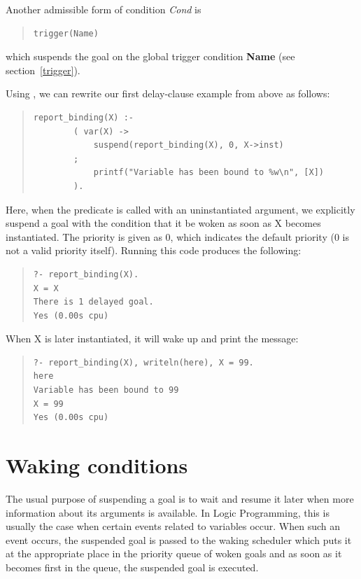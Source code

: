 Another admissible form of condition {\it Cond} is
\begin{quote}\begin{verbatim}
trigger(Name)
\end{verbatim}\end{quote}
which suspends the goal on the global trigger condition {\bf Name}
(see section~\ref{trigger}).


Using
,
we can rewrite our first delay-clause example from above as follows:
\begin{quote}\begin{verbatim}
report_binding(X) :-
        ( var(X) ->
            suspend(report_binding(X), 0, X->inst)
        ;
            printf("Variable has been bound to %w\n", [X])
        ).
\end{verbatim}\end{quote}
Here, when the predicate is called with an uninstantiated argument,
we explicitly suspend a goal with the condition that it be woken as
soon as X becomes instantiated. The priority is given as 0, which indicates
the default priority (0 is not a valid priority itself).
Running this code produces the following:
\begin{quote}\begin{verbatim}
?- report_binding(X).
X = X
There is 1 delayed goal.
Yes (0.00s cpu)
\end{verbatim}\end{quote}
When X is later instantiated, it will wake up and print the message:
\begin{quote}\begin{verbatim}
?- report_binding(X), writeln(here), X = 99.
here
Variable has been bound to 99
X = 99
Yes (0.00s cpu)
\end{verbatim}\end{quote}



\section{Waking conditions}
The usual purpose of suspending a goal is to wait and resume it later
when more information about its arguments is available.
In Logic Programming, this is usually the case when certain events
related to variables occur.
When such an event occurs, the suspended goal is passed to the
waking scheduler which puts it at the appropriate place
in the priority queue of woken goals and as soon as it becomes
first in the queue, the suspended goal is executed.


